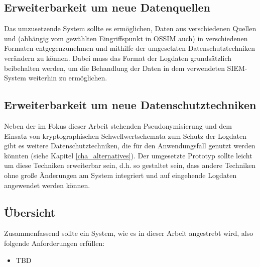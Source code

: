 \subsection{Erweiterbarkeit um neue Datenquellen}

\label{subsec_impl_requirements_differentsources}

Das umzusetzende System sollte es ermöglichen, Daten aus verschiedenen Quellen und (abhängig vom gewählten Eingriffspunkt in OSSIM auch) in verschiedenen Formaten entgegenzunehmen und mithilfe der umgesetzten Datenschutztechniken verändern zu können. Dabei muss das Format der Logdaten grundsätzlich beibehalten werden, um die Behandlung der Daten in dem verwendeten SIEM-System weiterhin zu ermöglichen.

\subsection{Erweiterbarkeit um neue Datenschutztechniken}

\label{subsec_impl_requirements_plugins}

Neben der im Fokus dieser Arbeit stehenden Pseudonymisierung und dem Einsatz von kryptographischen Schwellwertschemata zum Schutz der Logdaten gibt es weitere Datenschutztechniken, die für den Anwendungsfall genutzt werden könnten (siehe Kapitel \ref{cha_alternatives}). Der umgesetzte Prototyp sollte leicht um diese Techniken erweiterbar sein, d.h. so gestaltet sein, dass andere Techniken ohne große Änderungen am System integriert und auf eingehende Logdaten angewendet werden können.


\subsection{Übersicht}

Zusammenfassend sollte ein System, wie es in dieser Arbeit angestrebt wird, also folgende Anforderungen erfüllen:

\begin{itemize}
  \item TBD
\end{itemize}
